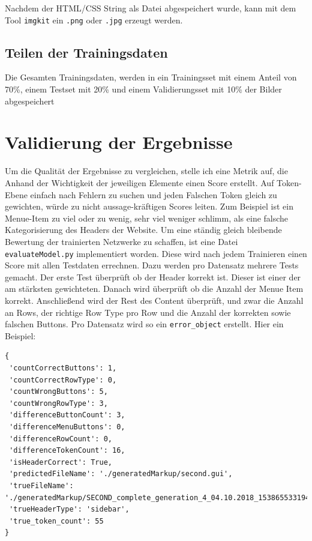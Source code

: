 \documentclass[pdftex,a4paper,halfparskip, article]{scrartcl}
\begin{document}
Nachdem der HTML/CSS String als Datei abgespeichert wurde, kann mit dem Tool \texttt{imgkit} ein \texttt{.png} oder \texttt{.jpg} erzeugt werden.

\subsection{Teilen der Trainingsdaten}

Die Gesamten Trainingsdaten, werden in ein Trainingsset mit einem Anteil von 70\%, einem Testset mit 20\% und einem Validierungsset mit 10\% der Bilder abgespeichert

\section{Validierung der Ergebnisse}

Um die Qualität der Ergebnisse zu vergleichen, stelle ich eine Metrik auf, die Anhand der Wichtigkeit der jeweiligen Elemente einen Score erstellt. Auf Token-Ebene einfach nach Fehlern zu suchen und jeden Falschen Token gleich zu gewichten, würde zu nicht aussage-kräftigen Scores leiten. Zum Beispiel ist ein Menue-Item zu viel oder zu wenig, sehr viel weniger schlimm, als eine falsche Kategorisierung des Headers der Website. Um eine ständig gleich bleibende Bewertung der trainierten Netzwerke zu schaffen, ist eine Datei \texttt{evaluateModel.py} implementiert worden. Diese wird nach jedem Trainieren einen Score mit allen Testdaten errechnen. Dazu werden pro Datensatz mehrere Tests gemacht. Der erste Test überprüft ob der Header korrekt ist. Dieser ist einer der am stärksten gewichteten. Danach wird überprüft ob die Anzahl der Menue Item korrekt. Anschließend wird der Rest des Content überprüft, und zwar die Anzahl an Rows, der richtige Row Type pro Row und die Anzahl der korrekten sowie falschen Buttons. Pro Datensatz wird so ein \texttt{error\_object} erstellt. 
Hier ein Beispiel:

\begin{verbatim}
{
 'countCorrectButtons': 1,
 'countCorrectRowType': 0,
 'countWrongButtons': 5,
 'countWrongRowType': 3,
 'differenceButtonCount': 3,
 'differenceMenuButtons': 0,
 'differenceRowCount': 0,
 'differenceTokenCount': 16,
 'isHeaderCorrect': True,
 'predictedFileName': './generatedMarkup/second.gui',
 'trueFileName': './generatedMarkup/SECOND_complete_generation_4_04.10.2018_1538655331945.gui',
 'trueHeaderType': 'sidebar',
 'true_token_count': 55
}
\end{verbatim}
\end{document}
